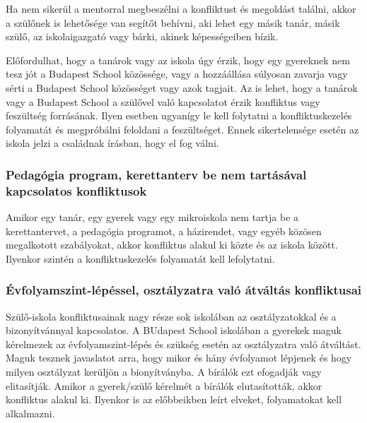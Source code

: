 Ha nem sikerül a mentorral megbeszélni a konfliktust és megoldást találni,
akkor a szülőnek is lehetősége van segítőt behívni, aki lehet egy másik tanár,
másik szülő, az iskolaigazgató vagy bárki, akinek képességeiben bízik.

Előfordulhat, hogy a tanárok vagy az iskola úgy érzik, hogy egy
gyereknek nem tesz jót a Budapest School közössége, vagy a hozzáállása
súlyosan zavarja vagy sérti a Budapest School közösséget vagy azok
tagjait. Az is lehet, hogy a tanárok vagy a Budapest School a szülővel
való kapcsolatot érzik konfliktus vagy feszültség forrásának. Ilyen
esetben ugyanígy le kell folytatni a konfliktuskezelés folyamatát és
megpróbálni feloldani a feszültséget. Ennek sikertelensége esetén az
iskola jelzi a családnak írásban, hogy el fog válni.

\subsubsection{Pedagógia program, kerettanterv be nem tartásával
      kapcsolatos konfliktusok}

Amikor egy tanár, egy gyerek vagy egy mikroiskola nem tartja be a
kerettantervet, a pedagógia programot, a házirendet, vagy egyéb közösen
megalkotott szabályokat, akkor konfliktus alakul ki közte és az iskola
között. Ilyenkor szintén a konfliktuskezelés folyamatát kell
lefolytatni.

\subsubsection{Évfolyamszint-lépéssel, osztályzatra való átváltás konfliktusai}
Szülő-iskola konfliktusainak nagy része sok iskolában az osztályzatokkal és a
bizonyítvánnyal kapcsolatos.
A BUdapest School iskolában a gyerekek maguk kérelmezek az évfolyamszint-lépés
és szükség esetén az osztályzatra való átváltást. Maguk tesznek javaslatot
arra, hogy mikor és hány évfolyamot lépjenek és hogy milyen osztályzat kerüljön
a bionyítványba. A bírálók ezt efogadják vagy elitasítják. Amikor a
gyerek/szülő kérelmét a bírálók elutasították, akkor konfliktus alakul ki.
Ilyenkor is az előbbeikben leírt elveket, folyamatokat kell alkalmazni.